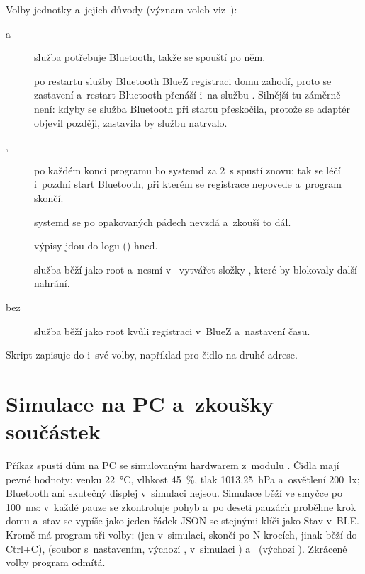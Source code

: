 Volby jednotky a~jejich důvody (význam voleb viz~\cite{systemd-unit}):
\begin{description}
  \item[ a~] služba  potřebuje Bluetooth,
        takže se spouští po něm.
  \item[] po restartu služby Bluetooth BlueZ registraci domu
        zahodí, proto se zastavení a~restart Bluetooth přenáší i~na službu . Silnější
         tu záměrně není: kdyby se služba Bluetooth při startu přeskočila, protože
        se adaptér objevil později, zastavila by službu  natrvalo.
  \item[, ] po každém konci programu ho systemd za 2~s
        spustí znovu; tak se léčí i~pozdní start Bluetooth, při kterém se registrace nepovede
        a~program skončí.
  \item[] systemd se po opakovaných pádech nevzdá a~zkouší to dál.
  \item[] výpisy jdou do logu () hned.
  \item[] služba běží jako root a~nesmí v~
        vytvářet složky , které by blokovaly další nahrání.
  \item[bez ] služba běží jako root kvůli registraci v~BlueZ a~nastavení času.
\end{description}
Skript zapisuje do  i~své volby, například  pro čidlo
na druhé adrese.

\section{Simulace na PC a~zkoušky součástek}
\label{sec:simulace}

Příkaz  spustí dům na PC se simulovaným hardwarem z~modulu
. Čidla mají pevné hodnoty: venku 22~°C, vlhkost 45~\%, tlak
1013,25~hPa a~osvětlení 200~lx; Bluetooth ani skutečný displej v~simulaci nejsou. Simulace běží
ve smyčce po 100~ms: v~každé pauze se zkontroluje pohyb a~po deseti pauzách proběhne krok domu
a~stav se vypíše jako jeden řádek JSON se stejnými klíči jako Stav v~BLE. Kromě
 má program tři volby:  (jen v~simulaci, skončí po N krocích,
jinak běží do Ctrl+C),  (soubor s~nastavením, výchozí
, v~simulaci )
a~ (výchozí ). Zkrácené volby program odmítá.

